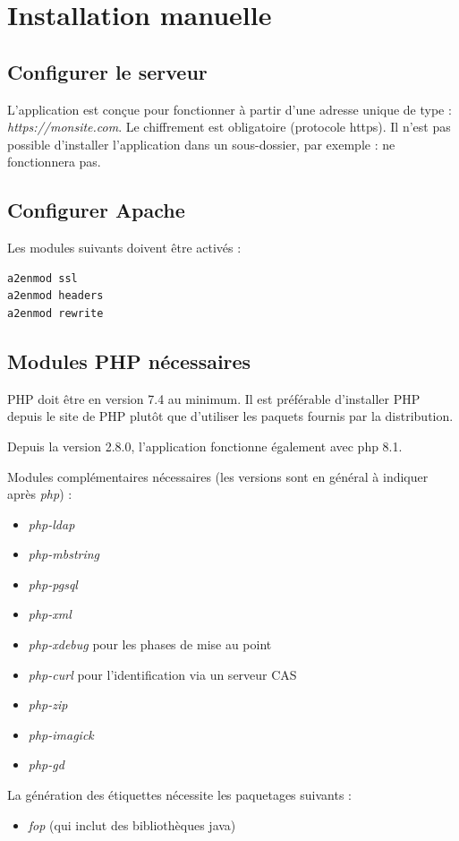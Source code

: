 \section{Installation manuelle}
\subsection{Configurer le serveur}

L'application est conçue pour fonctionner à partir d'une adresse unique de type : {\NoAutoSpacing\textit{https://monsite.com}}. Le chiffrement est obligatoire (protocole https). Il n'est pas possible d'installer l'application dans un sous-dossier, par exemple :  ne fonctionnera pas.


\subsection{Configurer Apache}
Les modules suivants doivent être activés :
\begin{lstlisting}
a2enmod ssl
a2enmod headers
a2enmod rewrite
\end{lstlisting}

\subsection{Modules PHP nécessaires}
PHP doit être en version 7.4 au minimum. Il est préférable d'installer PHP depuis le site de PHP plutôt que d'utiliser les paquets fournis par la distribution.

Depuis la version 2.8.0, l'application fonctionne également avec php 8.1.

Modules complémentaires nécessaires (les versions sont en général à indiquer après \textit{php}) :
\begin{itemize}
\item \textit{php-ldap}
\item \textit{php-mbstring}
\item \textit{php-pgsql}
\item \textit{php-xml} 
\item \textit{php-xdebug} pour les phases de mise au point
\item \textit{php-curl} pour l'identification via un serveur CAS
\item \textit{php-zip}
\item \textit{php-imagick}
\item \textit{php-gd}

\end{itemize}
La génération des étiquettes nécessite les paquetages suivants :
\begin{itemize}
\item \textit{fop} (qui inclut des bibliothèques java)
\end{itemize}


